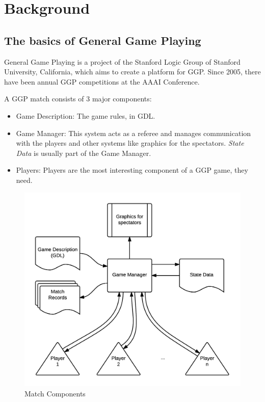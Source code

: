 
\chapter{Background}
\label{chapter:background}

\section{The basics of General Game Playing}

General Game Playing is a project of the Stanford Logic Group of Stanford University, California, which aims to create a platform for \gls{GGP}.
Since 2005, there have been annual \gls{GGP} competitions at the AAAI Conference.

A \gls{GGP} match consists of 3 major components:
\begin{itemize}
\item Game Description: The game rules, in \gls{GDL}.

\item Game Manager: This system acts as a referee and manages communication with the players and other systems like graphics for the spectators. \textit{State Data} is usually part of the Game Manager.

\item Players: Players are the most interesting component of a \gls{GGP} game, they need.

\end{itemize}

\begin{figure}[h]
	\centering
    \includegraphics[scale=0.75]{images/GGPgamesetup.png}
    \caption{Match Components}
    \label{fig:match components}
\end{figure}

